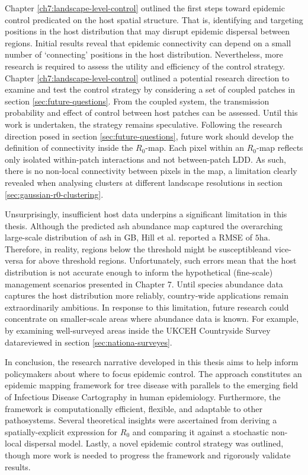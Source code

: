 Chapter \ref{ch7:landscape-level-control} outlined the first steps toward epidemic control predicated on the host spatial structure.
That is, identifying and targeting positions in the host distribution that may disrupt epidemic dispersal between regions.
Initial results reveal that epidemic connectivity can depend on a small number of `connecting' positions in the host distribution.
Nevertheless, more research is required to assess the utility and efficiency of the control strategy. Chapter \ref{ch7:landscape-level-control}
outlined a potential research direction to examine and test the control strategy by considering a set of coupled patches in section \ref{sec:future-questions}.
From the coupled system,  the transmission probability and effect of control between host patches can be assessed.
Until this work is undertaken, the strategy remains speculative.
Following the research direction posed in section \ref{sec:future-questions}, future work should develop the definition of connectivity inside the $R_0$-map. Each pixel within an $R_0$-map reflects only isolated within-patch interactions and not between-patch LDD.
As such, there is no non-local connectivity between pixels in the map, 
a limitation clearly revealed when analysing clusters at different landscape resolutions in section \ref{sec:gaussian-r0-clustering}.

Unsurprisingly, insufficient host data underpins a significant limitation in this thesis.
Although the predicted ash abundance map captured the overarching large-scale distribution of ash in GB, Hill et al. reported a RMSE of $5\mathrm{ha}$. Therefore, in reality, regions below the threshold might be susceptible\textemdash and vice-versa for above threshold regions.
Unfortunately, such errors mean that the host distribution is not accurate enough to inform the hypothetical (fine-scale) management scenarios presented in Chapter 7. Until species abundance data captures the host distribution more reliably, country-wide applications remain extraordinarily ambitious. In response to this limitation, future research could concentrate on smaller-scale areas where abundance data is known. For example, by examining well-surveyed areas inside the UKCEH Countryside Survey data\textemdash reviewed in section \ref{sec:nationa-surveyes}.

In conclusion, the research narrative developed in this thesis aims to help inform policymakers about where to focus epidemic control.
The approach constitutes an epidemic mapping framework for tree disease with parallels to the emerging field of Infectious Disease Cartography in human epidemiology. Furthermore, the framework is computationally efficient, flexible, and adaptable to other pathosystems.
Several theoretical insights were ascertained from deriving a spatially-explicit expression for $R_0$ and comparing it against a stochastic non-local dispersal model. Lastly, a novel epidemic control strategy was outlined, though more work is needed to progress the framework and rigorously validate results.

